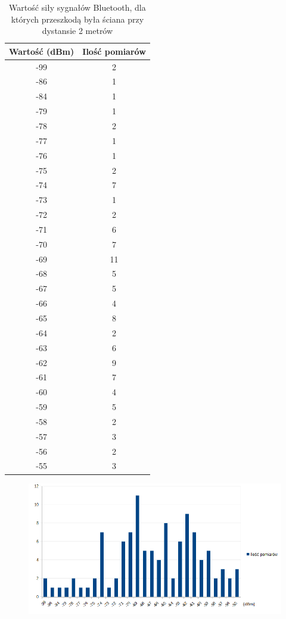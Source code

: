 \begin{table}[H]
	\caption {Wartość siły sygnałów Bluetooth, dla których przeszkodą była ściana przy dystansie 2 metrów}
\begin{center}
	\begin{tabular}{|c|c|}
		\hline
		Wartość (dBm) & Ilość pomiarów \\ 
		\hline
		-99 & 2\\
		\hline
		-86 & 1\\
		\hline
		-84 & 1\\
		\hline
		-79 & 1\\
		\hline
		-78 & 2\\
		\hline
		-77 & 1\\
		\hline
		-76 & 1\\
		\hline
		-75 & 2\\
		\hline
		-74 & 7\\
		\hline
		-73 & 1\\
		\hline
		-72 & 2\\
		\hline
		-71 & 6\\
		\hline
		-70 & 7\\
		\hline
		-69 &11\\
		\hline
		-68 & 5\\
		\hline
		-67 & 5\\
		\hline
		-66 & 4\\
		\hline
		-65 & 8\\
		\hline
		-64 & 2\\
		\hline
		-63 & 6\\
		\hline
		-62 & 9\\
		\hline
		-61 & 7\\
		\hline
		-60 & 4\\
		\hline
		-59 & 5\\
		\hline
		-58 & 2\\
		\hline
		-57 & 3\\
		\hline
		-56 & 2\\
		\hline
		-55 & 3\\
		\hline
	\end{tabular}
\end{center}
\end{table}
\begin{figure}[H]			
\centering
\includegraphics[width=1.0\textwidth]{wykres_bluetooth_4}
\end{figure}
